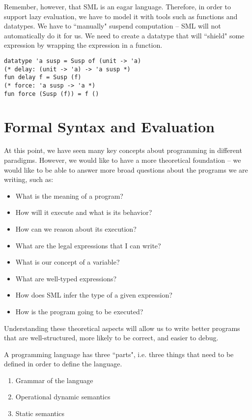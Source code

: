 \documentclass[11pt]{article}
\begin{document}
Remember, however, that SML is an eagar language. Therefore, in order to support lazy evaluation, we have to model it with tools such as functions and datatypes. We have to ``manually" suspend computation -- SML will not automatically do it for us. We need to create a datatype that will ``shield" some expression by wrapping the expression in a function.

\begin{verbatim}
datatype 'a susp = Susp of (unit -> 'a)
(* delay: (unit -> 'a) -> 'a susp *)
fun delay f = Susp (f)
(* force: 'a susp -> 'a *)
fun force (Susp (f)) = f ()
\end{verbatim}

\section{Formal Syntax and Evaluation}
At this point, we have seen many key concepts about programming in different paradigms. However, we would like to have a more theoretical foundation -- we would like to be able to answer more broad questions about the programs we are writing, such as:
\begin{itemize}
    \item What is the meaning of a program?
    \item How will it execute and what is its behavior?
    \item How can we reason about its execution?
    \item What are the legal expressions that I can write?
    \item What is our concept of a variable?
    \item What are well-typed expressions?
    \item How does SML infer the type of a given expression?
    \item How is the program going to be executed?
\end{itemize}

Understanding these theoretical aspects will allow us to write better programs that are well-structured, more likely to be correct, and easier to debug.

A programming language has three ``parts", i.e. three things that need to be defined in order to define the language.
    \begin{enumerate}
        \item Grammar of the language
        \item Operational dynamic semantics
        \item Static semantics
    \end{enumerate}
\end{document}
